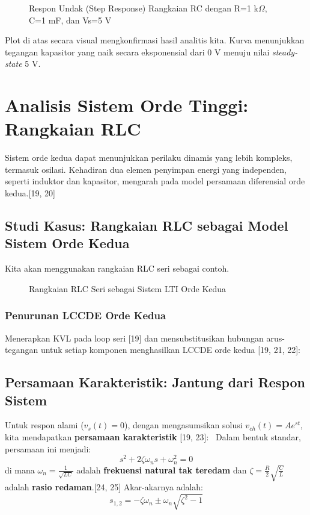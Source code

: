 \documentclass[12pt, a4paper]{article}
\begin{document}
\begin{figure}[H]
    \centering
    \caption{Respon Undak (Step Response) Rangkaian RC dengan R=1 k$\Omega$, C=1 mF, dan Vs=5 V}
    \label{fig:rc-step-response}
\end{figure}

Plot di atas secara visual mengkonfirmasi hasil analitis kita. Kurva menunjukkan tegangan kapasitor yang naik secara eksponensial dari 0 V menuju nilai \textit{steady-state} 5 V.

\section{Analisis Sistem Orde Tinggi: Rangkaian RLC}
Sistem orde kedua dapat menunjukkan perilaku dinamis yang lebih kompleks, termasuk osilasi. Kehadiran dua elemen penyimpan energi yang independen, seperti induktor dan kapasitor, mengarah pada model persamaan diferensial orde kedua.[19, 20]

\subsection{Studi Kasus: Rangkaian RLC sebagai Model Sistem Orde Kedua}
Kita akan menggunakan rangkaian RLC seri sebagai contoh.
\begin{figure}[H]
    \centering
    \caption{Rangkaian RLC Seri sebagai Sistem LTI Orde Kedua}
    \label{fig:rlc-circuit}
\end{figure}

\subsubsection{Penurunan LCCDE Orde Kedua}
Menerapkan KVL pada loop seri [19] dan mensubstitusikan hubungan arus-tegangan untuk setiap komponen menghasilkan LCCDE orde kedua [19, 21, 22]:
\

\subsection{Persamaan Karakteristik: Jantung dari Respon Sistem}
Untuk respon alami ($v_s(t) = 0$), dengan mengasumsikan solusi $v_{ch}(t) = A e^{st}$, kita mendapatkan \textbf{persamaan karakteristik} [19, 23]:
\
Dalam bentuk standar, persamaan ini menjadi:
\[
s^2 + 2\zeta\omega_n s + \omega_n^2 = 0
\]
di mana $\omega_n = \frac{1}{\sqrt{LC}}$ adalah \textbf{frekuensi natural tak teredam} dan $\zeta = \frac{R}{2} \sqrt{\frac{C}{L}}$ adalah \textbf{rasio redaman}.[24, 25] Akar-akarnya adalah:
\[
s_{1,2} = -\zeta\omega_n \pm \omega_n \sqrt{\zeta^2 - 1}
\]
\end{document}
